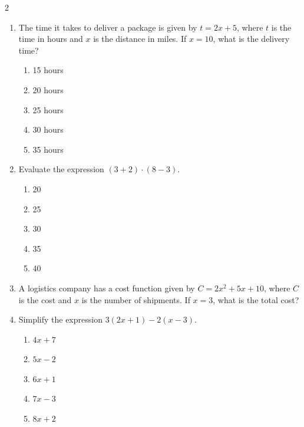 \documentclass[10pt]{article}
\begin{document}
\begin{multicols}{2}
\begin{enumerate}[label=\textbf{Q\arabic*.}, leftmargin=*, itemsep=6pt, parsep=0pt]
  \item \small The time it takes to deliver a package is given by $t = 2x + 5$, where $t$ is the time in hours and $x$ is the distance in miles. If $x = 10$, what is the delivery time?
  \begin{enumerate}[label=(\Alph*), leftmargin=0.6cm, nosep, itemsep=2pt]
    \item 15 hours
    \item 20 hours
    \item 25 hours
    \item 30 hours
    \item 35 hours
  \end{enumerate}

  \item \small Evaluate the expression $(3 + 2) \cdot (8 - 3)$.
  \begin{enumerate}[label=(\Alph*), leftmargin=0.6cm, nosep, itemsep=2pt]
    \item 20
    \item 25
    \item 30
    \item 35
    \item 40
  \end{enumerate}

  \item \small A logistics company has a cost function given by $C = 2x^2 + 5x + 10$, where $C$ is the cost and $x$ is the number of shipments. If $x = 3$, what is the total cost?

  \item \small Simplify the expression $3(2x + 1) - 2(x - 3)$.
  \begin{enumerate}[label=(\Alph*), leftmargin=0.6cm, nosep, itemsep=2pt]
    \item $4x + 7$
    \item $5x - 2$
    \item $6x + 1$
    \item $7x - 3$
    \item $8x + 2$
  \end{enumerate}


\end{enumerate}
\end{multicols}
\end{document}

